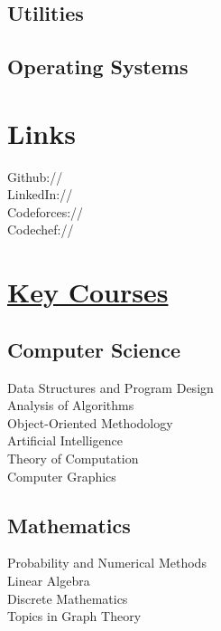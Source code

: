\documentclass[]{deedy-resume-openfont}
\begin{document}
\begin{minipage}[t]{0.33\textwidth}
\subsection{Utilities}
\sectionsep

\subsection{Operating Systems}


\section{Links} 
Github:// \href{https://github.com/goswami-rahul}{} \\
LinkedIn://  \href{https://www.linkedin.com/in/rahul101}{} \\
Codeforces:// \href{https://codeforces.com/profile/Rahul}{} \\
Codechef:// \href{https://www.codechef.com/users/rahul_g}{}
\sectionsep


\section{\href{http://nituk.ac.in/syllabus/Course\%20Syllabi\%20CSE.pdf}{Key Courses}}

\subsection{Computer Science}
Data Structures and Program Design \\
Analysis of Algorithms \\
Object-Oriented Methodology \\ 
Artificial Intelligence \\
Theory of Computation \\
Computer Graphics \\
\sectionsep

\subsection{Mathematics}
Probability and Numerical Methods \\
Linear Algebra \\
Discrete Mathematics \\
Topics in Graph Theory \\ 



%
%

\end{minipage} 
\end{document}
